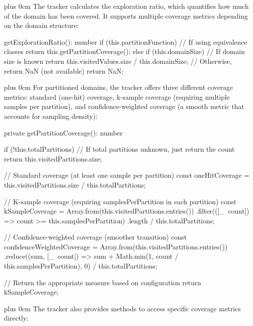 \documentclass[conference]{IEEEtran}
\newcommand{\justifytext}{\leftskip=0pt \rightskip=0pt plus 0cm}
\begin{document}
\justifytext
The tracker calculates the exploration ratio, which quantifies how much of the domain has been covered. It supports multiple coverage metrics depending on the domain structure:

\begin{wrappedcode}
  getExplorationRatio(): number {
    if (this.partitionFunction) {
      // If using equivalence classes
      return this.getPartitionCoverage();
    } else if (this.domainSize) {
      // If domain size is known
      return this.visitedValues.size / this.domainSize;
    }
    // Otherwise, return NaN (not available)
    return NaN;
  }
\end{wrappedcode}

\justifytext
For partitioned domains, the tracker offers three different coverage metrics: standard (one-hit) coverage, k-sample coverage (requiring multiple samples per partition), and confidence-weighted coverage (a smooth metric that accounts for sampling density):

\begin{wrappedcode}
  private getPartitionCoverage(): number {
    if (!this.totalPartitions) {
      // If total partitions unknown, just return the count
      return this.visitedPartitions.size;
    }
    
    // Standard coverage (at least one sample per partition)
    const oneHitCoverage = this.visitedPartitions.size / this.totalPartitions;
    
    // K-sample coverage (requiring samplesPerPartition in each partition)
    const kSampleCoverage = Array.from(this.visitedPartitions.entries())
      .filter(([\_\, count]) => count >= this.samplesPerPartition)
      .length / this.totalPartitions;
      
    // Confidence-weighted coverage (smoother transition)
    const confidenceWeightedCoverage = Array.from(this.visitedPartitions.entries())
      .reduce((sum, [\_\, count]) => sum + Math.min(1, count / this.samplesPerPartition), 0) 
      / this.totalPartitions;
    
    // Return the appropriate measure based on configuration
    return kSampleCoverage;
  }
\end{wrappedcode}

\justifytext
The tracker also provides methods to access specific coverage metrics directly:
\end{document}
